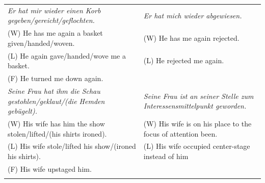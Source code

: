 \documentclass[output=paper]{langsci/langscibook}
\begin{document}
\begin{table}
\begin{tabularx}{\textwidth}{QQ}
\textit{Er hat mir wieder einen Korb gegeben/gereicht/geflochten.}              & \textit{Er hat mich wieder abgewiesen.}                                       \\
\hspace{3mm}(W) He has me again a basket given/handed/woven.                                & \hspace{3mm}(W) He has me again rejected.                                                 \\
\hspace{3mm}(L) He again gave/handed/wove me a basket.                                      & \hspace{3mm}(L) He rejected me again.                                                     \\
\hspace{3mm}(F) He turned me down again.                                                    &                                                                               \\ \tablevspace
\textit{Seine Frau hat ihm die Schau gestohlen/geklaut\slash (die Hemden gebügelt).} & \textit{Seine Frau ist an seiner Stelle zum Interessensmittelpunkt geworden.} \\
\hspace{3mm}(W) His wife has him the show stolen/lifted\slash (his shirts ironed).               & \hspace{3mm}(W) His wife is on his place to the focus of attention been.                  \\
\hspace{3mm}(L) His wife stole/lifted his show\slash (ironed his shirts).                        & \hspace{3mm}(L) His wife occupied center-stage instead of him                             \\
\hspace{3mm}(F) His wife upstaged him.                                                      &                                                                               \\ \lspbottomrule
\end{tabularx}
\end{table}
\end{document}
